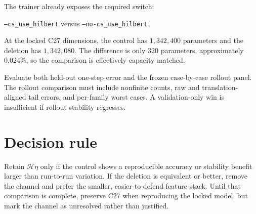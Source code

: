 \documentclass[11pt]{article}
\newcommand{\Hil}{\mathcal{H}}
\begin{document}
The trainer already exposes the required switch:
\begin{center}
\texttt{--cs\_use\_hilbert}
\qquad versus \qquad
\texttt{--no-cs\_use\_hilbert}.
\end{center}

At the locked C27 dimensions, the control has $1{,}342{,}400$ parameters and
the deletion has $1{,}342{,}080$.  The difference is only $320$ parameters,
approximately $0.024\%$, so the comparison is effectively capacity matched.

Evaluate both held-out one-step error and the frozen case-by-case rollout
panel.  The rollout comparison must include nonfinite counts, raw and
translation-aligned tail errors, and per-family worst cases.  A validation-only
win is insufficient if rollout stability regresses.

\section{Decision rule}

Retain $\Hil\eta$ only if the control shows a reproducible accuracy or stability
benefit larger than run-to-run variation.  If the deletion is equivalent or
better, remove the channel and prefer the smaller, easier-to-defend feature
stack.  Until that comparison is complete, preserve C27 when reproducing the
locked model, but mark the channel as unresolved rather than justified.
\end{document}
